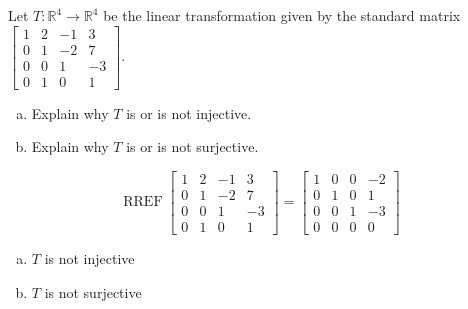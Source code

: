 
\begin{exerciseStatement}
 Let \(T:\mathbb{R}^ 4  \to \mathbb{R}^ 4 \) be the linear transformation given by the standard matrix \( \left[\begin{array}{cccc}
1 & 2 & -1 & 3 \\
0 & 1 & -2 & 7 \\
0 & 0 & 1 & -3 \\
0 & 1 & 0 & 1
\end{array}\right] .\)
\begin{enumerate}[(a)]
\item Explain why \(T\) is or is not injective.
\item Explain why \(T\) is or is not surjective.
\end{enumerate}
    
\end{exerciseStatement}
    
\begin{exerciseAnswer} 


\[\operatorname{RREF} \left[\begin{array}{cccc}
1 & 2 & -1 & 3 \\
0 & 1 & -2 & 7 \\
0 & 0 & 1 & -3 \\
0 & 1 & 0 & 1
\end{array}\right] = \left[\begin{array}{cccc}
1 & 0 & 0 & -2 \\
0 & 1 & 0 & 1 \\
0 & 0 & 1 & -3 \\
0 & 0 & 0 & 0
\end{array}\right] \]


\begin{enumerate}[(a)]
\item \(T\) is not injective
\item \(T\) is not surjective
\end{enumerate}
    
\end{exerciseAnswer}
    
